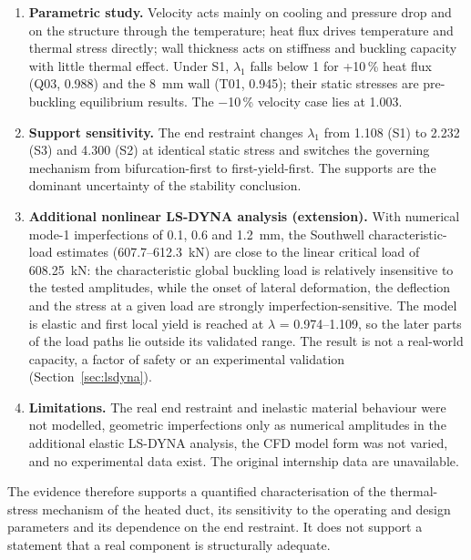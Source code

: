 \begin{enumerate}
      column, not a collapse load and not a factor of safety.
\item \textbf{Parametric study.} Velocity acts mainly on cooling and pressure drop and on the structure through the temperature; heat flux
      drives temperature and thermal stress directly; wall thickness acts on stiffness and buckling capacity with little thermal effect. Under
      S1, $\lambda_1$ falls below 1 for +10\,\% heat flux (Q03, 0.988) and the 8~mm wall (T01, 0.945); their static stresses are pre-buckling
      equilibrium results. The $-$10\,\% velocity case lies at 1.003.
\item \textbf{Support sensitivity.} The end restraint changes $\lambda_1$ from 1.108 (S1) to 2.232 (S3) and 4.300 (S2) at identical static stress
      and switches the governing mechanism from bifurcation-first to first-yield-first. The supports are the dominant uncertainty of the
      stability conclusion.
\item \textbf{Additional nonlinear LS-DYNA analysis (extension).} With numerical mode-1 imperfections of 0.1, 0.6 and 1.2~mm, the
      Southwell characteristic-load estimates (607.7--612.3~kN) are close to the linear critical load of 608.25~kN: the characteristic
      global buckling load is relatively insensitive to the tested amplitudes, while the onset of lateral deformation, the deflection
      and the stress at a given load are strongly imperfection-sensitive. The model is elastic and first local yield is reached at
      $\lambda$ = 0.974--1.109, so the later parts of the load paths lie outside its validated range. The result is not a real-world
      capacity, a factor of safety or an experimental validation (Section~\ref{sec:lsdyna}).
\item \textbf{Limitations.} The real end restraint and inelastic material behaviour were not modelled, geometric imperfections only as
      numerical amplitudes in the additional elastic LS-DYNA analysis, the CFD model form was not varied, and no experimental data exist. The original internship data are unavailable.
\end{enumerate}

The evidence therefore supports a quantified characterisation of the thermal-stress mechanism of the heated duct, its sensitivity to the
operating and design parameters and its dependence on the end restraint. It does not support a statement that a real component is
structurally adequate.
